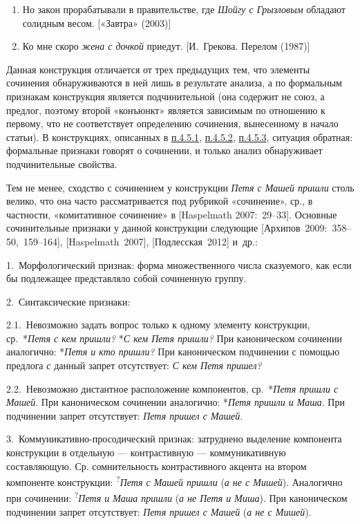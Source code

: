 \begin{enumerate}
  \def\labelenumi{(\arabic{enumi})}
  \setcounter{enumi}{62}
  \item
        Но закон прорабатывали в правительстве, где \textit{Шойгу с Грызловым}
        обладают солидным весом. {[}«Завтра» (2003){]}
  \item
        Ко мне скоро \textit{жена с дочкой} приедут. {[}И.~Грекова. Перелом
        (1987){]}
\end{enumerate}

Данная конструкция отличается от трех предыдущих тем, что элементы
сочинения обнаруживаются в ней лишь в результате анализа, а по
формальным признакам конструкция является подчинительной (она содержит
не союз, а предлог, поэтому второй «конъюнкт» является зависимым по
отношению к первому, что не соответствует определению сочинения,
вынесенному в начало статьи). В конструкциях, описанных в
\underline{п.4.5.1}, \underline{п.4.5.2}, \underline{п.4.5.3}, ситуация
обратная: формальные признаки говорят о сочинении, и только анализ
обнаруживает подчинительные свойства.

Тем не менее, сходство с сочинением у конструкции \textit{Петя с Машей
  пришли} столь велико, что она часто рассматривается под рубрикой
«сочинение», ср., в частности, «комитативное сочинение» в {[}Haspelmath
2007:~29--33{]}. Основные сочинительные признаки у данной конструкции
следующие {[}Архипов~2009:~358--50,~159--164{]}, {[}Haspelmath~2007{]},
{[}Подлесская~2012{]} и~др.:

1.~Морфологический признак: форма множественного числа сказуемого, как
если бы подлежащее представляло собой сочиненную группу.

2.~Синтаксические признаки:

2.1.~Невозможно задать вопрос только к одному элементу конструкции,
ср.~*\textit{Петя с кем пришли?} *\textit{С кем Петя пришли?} При
каноническом сочинении аналогично: *\textit{Петя и кто пришли?} При
каноническом подчинении с помощью предлога \textit{с} данный запрет
отсутствует: \textit{С кем Петя пришел?}

2.2.~Невозможно дистантное расположение компонентов, ср.~*\textit{Петя
  пришли с Машей}. При каноническом сочинении аналогично: *\textit{Петя
  пришли и Маша}. При подчинении запрет отсутствует: \textit{Петя пришел с
  Машей}.

3.~Коммуникативно-просодический признак: затруднено выделение компонента
конструкции в отдельную --- контрастивную --- коммуникативную
составляющую. Ср. сомнительность контрастивного акцента на втором
компоненте конструкции: \textsuperscript{?}\textit{Петя с Машей пришли}
(\textit{а не с Мишей}). Аналогично при сочинении:
\textsuperscript{?}\textit{Петя и Маша пришли} (\textit{а не Петя и Миша}).
При каноническом подчинении запрет отсутствует: \textit{Петя пришел с
  Машей} (\textit{а не с Мишей}).

